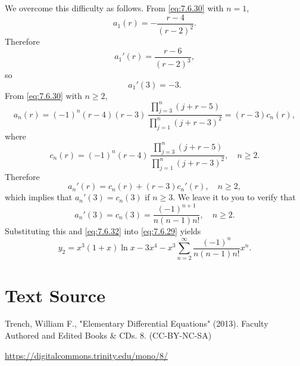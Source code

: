 \documentclass{ximera}
\begin{document}
\begin{example}
\begin{explanation}
We  overcome this difficulty as follows. From \eqref{eq:7.6.30} with
$n=1$,
$$
a_1(r)=-\frac{r-4}{(r-2)^2}.
$$
Therefore
$$
a_1'(r)=\frac{r-6}{(r-2)^3},
$$
so
\begin{equation} \label{eq:7.6.32}
a_1'(3)=-3.
\end{equation}
From \eqref{eq:7.6.30} with $n\geq 2$,
$$
a_n(r)=(-1)^n (r-4)(r-3)\,\frac{\prod_{j=3}^n(j+r-5)}{\prod_{j=1}^n(j+r-3)^2}
=(r-3)c_n(r),
$$
where
$$
c_n(r)=(-1)^n(r-4)\,
\frac{\prod_{j=3}^n(j+r-5)}{\prod_{j=1}^n(j+r-3)^2},\quad  n\geq 2.
$$
Therefore
$$
a_n'(r)=c_n(r)+(r-3)c_n'(r),\quad n\geq 2,
$$
which implies that  $a_n'(3)=c_n(3)$ if $n\geq 3$. We leave it to
you to verify that
$$
a_n'(3)=c_n(3)=\frac{(-1)^{n+1}}{n(n-1)n!},\quad n\geq 2.
$$
Substituting this and \eqref{eq:7.6.32} into \eqref{eq:7.6.29}
yields
$$
y_2=x^3(1+x)\ln x-3x^4-x^3\sum_{n=2}^\infty \frac{(-1)^n}{n(n-1)n!}x^n.
$$
\end{explanation}
\end{example}

\section*{Text Source}
Trench, William F., "Elementary Differential Equations" (2013). Faculty Authored and Edited Books \& CDs. 8. (CC-BY-NC-SA)

\href{https://digitalcommons.trinity.edu/mono/8/}{https://digitalcommons.trinity.edu/mono/8/}
\end{document}
